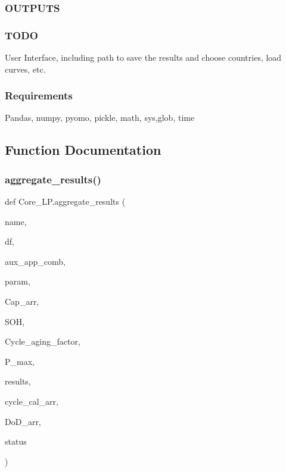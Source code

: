 \subsubsection*{O\+U\+T\+P\+U\+TS }

\subsubsection*{T\+O\+DO }

User Interface, including path to save the results and choose countries, load curves, etc. \subsubsection*{Requirements }

Pandas, numpy, pyomo, pickle, math, sys,glob, time 

\subsection{Function Documentation}
\mbox{\label{namespace_core___l_p_abf5153d05010f3e1a44886d3e54ebfc0}} 
\subsubsection{\texorpdfstring{aggregate\+\_\+results()}{aggregate\_results()}}
{\footnotesize\ttfamily def Core\+\_\+\+L\+P.\+aggregate\+\_\+results (\begin{DoxyParamCaption}\item[{}]{name,  }\item[{}]{df,  }\item[{}]{aux\+\_\+app\+\_\+comb,  }\item[{}]{param,  }\item[{}]{Cap\+\_\+arr,  }\item[{}]{S\+OH,  }\item[{}]{Cycle\+\_\+aging\+\_\+factor,  }\item[{}]{P\+\_\+max,  }\item[{}]{results,  }\item[{}]{cycle\+\_\+cal\+\_\+arr,  }\item[{}]{Do\+D\+\_\+arr,  }\item[{}]{status }\end{DoxyParamCaption})}


